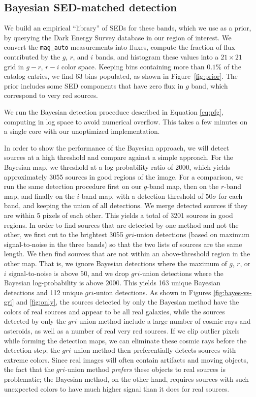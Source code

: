 \documentclass[11pt,letterpaper,linenumbers]{aastex63}
\newcommand{\figref}[1]{\mbox{Figure~\ref{#1}}}
\begin{document}
\subsection{Bayesian SED-matched detection}

We build an empirical ``library'' of SEDs for these bands, which we
use as a prior, by querying the Dark Energy Survey database in our
region of interest.  We convert the \texttt{mag\_auto} measurements
into fluxes, compute the fraction of flux contributed by the $g$, $r$,
and $i$ bands, and histogram these values into a $21 \times 21$ grid in
$g-r$, $r-i$ color space.
Keeping bins containing more than $0.1 \%$ of the catalog entries, we
find 63 bins populated, as shown in \figref{fig:prior}.  The prior
includes some SED components that have zero flux in $g$ band, which
correspond to very red sources.


We run the Bayesian detection proceduce described in Equation
\ref{eq:pfg}, computing in log space to avoid numerical overflow.
This takes a few minutes on a single core with our unoptimized
implementation.


In order to show the performance of the Bayesian approach, we will
detect sources at a high threshold and compare against a simple
approach.  For the Bayesian map, we threshold at a log-probability
ratio of $2000$, which yields approximately 3055 sources in good
regions of the image.  For a comparison, we run the same detection
procedure first on our $g$-band map, then on the $r$-band map, and
finally on the $i$-band map, with a detection threshold of $50 \sigma$
for each band, and keeping the union of all detections.  We merge
detected sources if they are within 5 pixels of each other.  This
yields a total of 3201 sources in good regions.  In order to find
sources that are detected by one method and not the other, we first
cut to the brightest 3055 $gri$-union detections (based on maximum
signal-to-noise in the three bands) so that the two lists of sources
are the same length.  We then find sources that are not within an
above-threshold region in the other map.  That is, we ignore Bayesian
detections where the maximum of $g$, $r$, or $i$ signal-to-noise is
above $50$, and we drop $gri$-union detections where the Bayesian
log-probability is above $2000$.  This yields 163 unique Bayesian
detections and 112 unique $gri$-union detections.  As shown in Figures
\ref{fig:bayes-vs-gri} and \ref{fig:only}, the sources detected by
only the Bayesian method have the colors of real sources and appear to
be all real galaxies, while the sources detected by only the $gri$-union
method include a large number of cosmic rays and asteroids, as well as
a number of real very red sources.
If we clip outlier pixels while forming the detection maps, we
can eliminate these cosmic rays before the detection step; the
$gri$-union method then preferentially detects sources with extreme
colors.  Since real images will often contain artifacts
and moving objects, the fact that the $gri$-union method \emph{prefers} these
objects to real sources is problematic; the Bayesian method, on
the other hand, requires sources with such unexpected colors to have
much higher signal than it does for real sources.
\end{document}
